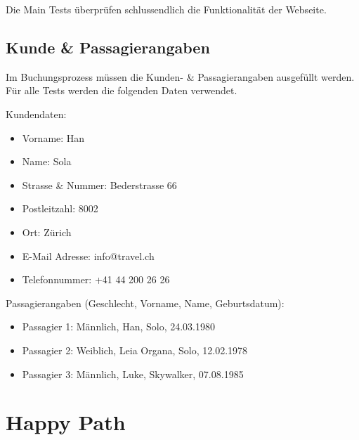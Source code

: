 Die Main Tests überprüfen schlussendlich die Funktionalität der Webseite.

\subsection{Kunde \& Passagierangaben}
\label{sec:Konzept:Übersicht:Angaben}
Im Buchungsprozess müssen die Kunden- \& Passagierangaben ausgefüllt werden. Für alle Tests werden die folgenden Daten verwendet.

Kundendaten:
\begin{itemize}
\item Vorname: Han
\item Name: Sola
\item Strasse \& Nummer: Bederstrasse 66
\item Postleitzahl: 8002
\item Ort: Zürich
\item E-Mail Adresse: info@travel.ch
\item Telefonnummer: +41 44 200 26 26 
\end{itemize}

Passagierangaben (Geschlecht, Vorname, Name, Geburtsdatum):
\begin{itemize}
\item Passagier 1: Männlich, Han, Solo, 24.03.1980
\item Passagier 2: Weiblich, Leia Organa, Solo, 12.02.1978
\item Passagier 3: Männlich, Luke, Skywalker, 07.08.1985
\end{itemize}

\section{Happy Path}
